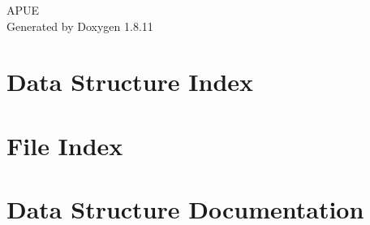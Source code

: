 \documentclass[twoside]{book}
\newcommand{\+}{\discretionary{\mbox{\scriptsize$\hookleftarrow$}}{}{}}
\newcommand{\clearemptydoublepage}{%
  \newpage{\pagestyle{empty}\cleardoublepage}%
}
\begin{document}
\hypersetup{pageanchor=false,
             bookmarksnumbered=true,
             pdfencoding=unicode
            }
\begin{titlepage}
\vspace*{7cm}
\begin{center}%
{\Large A\+P\+UE }\\
\vspace*{1cm}
{\large Generated by Doxygen 1.8.11}\\
\end{center}
\end{titlepage}
\clearemptydoublepage
\tableofcontents
\clearemptydoublepage
{}
\hypersetup{pageanchor=true}

\chapter{Data Structure Index}

\chapter{File Index}

\chapter{Data Structure Documentation}

\end{document}
